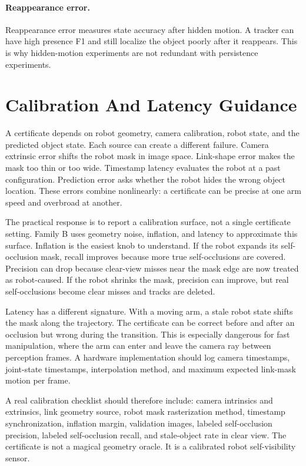 \documentclass{article}
\begin{document}
\paragraph{Reappearance error.}
Reappearance error measures state accuracy after hidden motion. A tracker can
have high presence F1 and still localize the object poorly after it reappears.
This is why hidden-motion experiments are not redundant with persistence
experiments.

\section{Calibration And Latency Guidance}

A certificate depends on robot geometry, camera calibration, robot state, and
the predicted object state. Each source can create a different failure. Camera
extrinsic error shifts the robot mask in image space. Link-shape error makes the
mask too thin or too wide. Timestamp latency evaluates the robot at a past
configuration. Prediction error asks whether the robot hides the wrong object
location. These errors combine nonlinearly: a certificate can be precise at one
arm speed and overbroad at another.

The practical response is to report a calibration surface, not a single
certificate setting. Family B uses geometry noise, inflation, and latency to
approximate this surface. Inflation is the easiest knob to understand. If the
robot expands its self-occlusion mask, recall improves because more true
self-occlusions are covered. Precision can drop because clear-view misses near
the mask edge are now treated as robot-caused. If the robot shrinks the mask,
precision can improve, but real self-occlusions become clear misses and tracks
are deleted.

Latency has a different signature. With a moving arm, a stale robot state shifts
the mask along the trajectory. The certificate can be correct before and after
an occlusion but wrong during the transition. This is especially dangerous for
fast manipulation, where the arm can enter and leave the camera ray between
perception frames. A hardware implementation should log camera timestamps,
joint-state timestamps, interpolation method, and maximum expected link-mask
motion per frame.

A real calibration checklist should therefore include: camera intrinsics and
extrinsics, link geometry source, robot mask rasterization method, timestamp
synchronization, inflation margin, validation images, labeled self-occlusion
precision, labeled self-occlusion recall, and stale-object rate in clear view.
The certificate is not a magical geometry oracle. It is a calibrated robot
self-visibility sensor.
\end{document}
